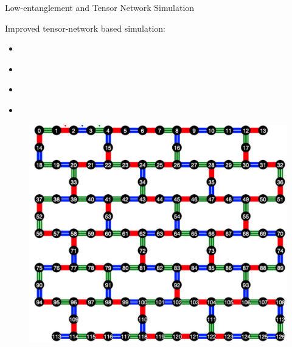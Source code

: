 \documentclass[10pt]{beamer}
\begin{document}
\begin{CJK}{UTF8}{gbsn}
\begin{frame}[fragile]{Low-entanglement and Tensor Network Simulation}
  
   \begin{minipage}{0.5\textwidth}
    Improved tensor-network based simulation:
     \begin{itemize}
       \item \cite{tindall2023efficient} 
       \item \cite{beguvsic2024fast}
       \item \cite{liao2023simulation}
       \item \cite{patra2024efficient}
     \end{itemize}
   \end{minipage}
   \hfill
   \begin{minipage}{0.45\textwidth}
     \begin{figure}
       \centering
       \includegraphics[width=\textwidth]{fig/ibm3.jpg}
     \end{figure}
   \end{minipage}
 
 \end{frame}
\end{CJK}
\end{document}
